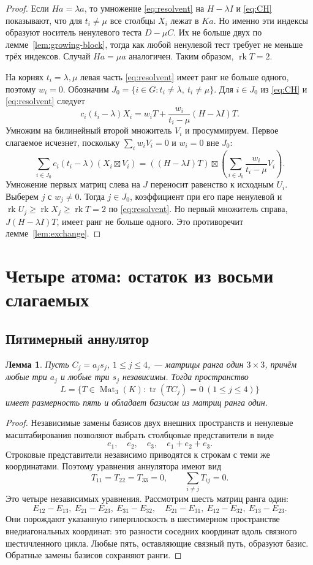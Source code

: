 \documentclass[11pt,a4paper]{article}
\numberwithin{equation}{section}
\theoremstyle{plain}
\newtheorem{lemma}[theorem]{Лемма}
\theoremstyle{definition}
\DeclareMathOperator{\tr}{tr}\DeclareMathOperator{\rk}{rk}
\DeclareMathOperator{\Mat}{Mat}\DeclareMathOperator{\Span}{span}
\newcommand{\leqs}{\leqslant}\newcommand{\geqs}{\geqslant}
\begin{document}
\begin{proof}
Если $Ha=\lambda a$, то умножение \eqref{eq:resolvent} на
$H-\lambda I$ и \eqref{eq:CH} показывают, что для $t_i\ne\mu$
все столбцы $X_i$ лежат в $Ka$. Но именно эти индексы образуют носитель
ненулевого теста $D-\mu C$. Их не больше двух по
лемме~\ref{lem:growing-block}, тогда как любой ненулевой тест требует
не меньше трёх индексов. Случай $Ha=\mu a$ аналогичен.
Таким образом, $\rk T=2$.

На корнях $t_i=\lambda,\mu$ левая часть \eqref{eq:resolvent} имеет
ранг не больше одного, поэтому $w_i=0$. Обозначим
$J_0=\{i\in G:t_i\ne\lambda,\ t_i\ne\mu\}$.
Для $i\in J_0$ из \eqref{eq:CH} и \eqref{eq:resolvent} следует
\[
 c_i(t_i-\lambda)X_i
 =w_iT+\frac{w_i}{t_i-\mu}(H-\lambda I)T.
\]
Умножим на билинейный второй множитель $V_i$ и просуммируем.
Первое слагаемое исчезнет, поскольку $\sum_iw_iV_i=0$ и $w_i=0$ вне $J_0$:
\[
 \sum_{i\in J_0}c_i(t_i-\lambda)(X_i\boxtimes V_i)
 =((H-\lambda I)T)\boxtimes
     \left(\sum_{i\in J_0}\frac{w_i}{t_i-\mu}V_i\right).
\]
Умножение первых матриц слева на $J$ переносит равенство к исходным
$U_i$. Выберем $j$ с $w_j\ne0$. Тогда $j\in J_0$, коэффициент при
его паре ненулевой и $\rk U_j\geqs\rk X_j\geqs\rk T=2$ по
\eqref{eq:resolvent}. Но первый множитель справа,
$J(H-\lambda I)T$, имеет ранг не больше одного.
Это противоречит лемме~\ref{lem:exchange}.
\end{proof}

\section{Четыре атома: остаток из восьми слагаемых}

\subsection{Пятимерный аннулятор}

\begin{lemma}\label{lem:annihilator}
Пусть $C_j=a_js_j$, $1\leqs j\leqs4$, --- матрицы ранга один $3\times3$,
причём любые три $a_j$ и любые три $s_j$ независимы.
Тогда пространство
\[
 L=\{T\in\Mat_3(K):\tr(TC_j)=0\ (1\leqs j\leqs4)\}
\]
имеет размерность пять и обладает базисом из матриц ранга один.
\end{lemma}
\begin{proof}
Независимые замены базисов двух внешних пространств и ненулевые
масштабирования позволяют выбрать столбцовые представители в виде
\[
 e_1,\quad e_2,\quad e_3,\quad e_1+e_2+e_3.
\]
Строковые представители независимо приводятся к строкам с теми же
координатами. Поэтому уравнения аннулятора имеют вид
\[
 T_{11}=T_{22}=T_{33}=0,\qquad \sum_{i\ne j}T_{ij}=0.
\]
Это четыре независимых уравнения. Рассмотрим шесть матриц ранга один:
\[
 E_{12}-E_{13},\ E_{21}-E_{23},\ E_{31}-E_{32},\quad
 E_{21}-E_{31},\ E_{12}-E_{32},\ E_{13}-E_{23}.
\]
Они порождают указанную гиперплоскость в шестимерном пространстве
внедиагональных координат: это разности соседних координат вдоль
связного шестичленного цикла. Любые пять, оставляющие связный путь,
образуют базис. Обратные замены базисов сохраняют ранги.
\end{proof}
\end{document}
